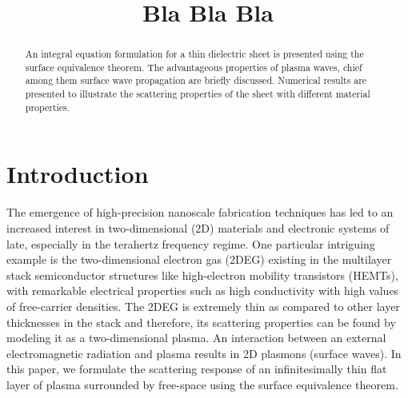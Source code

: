 \documentclass[conference, 10pt]{IEEEtran}
\renewcommand{\^}{\hat}  %
\begin{document}
\title{Bla Bla Bla }


\author{
\and
{}
}
\maketitle


%
\begin{abstract}
  An integral equation formulation for a thin dielectric sheet is presented using the surface equivalence theorem. The advantageous properties of plasma waves, chief among them surface wave propagation are briefly discussed. Numerical results are presented to illustrate the scattering properties of the sheet with different material properties.
\end{abstract}

\IEEEpeerreviewmaketitle
\section{Introduction}

The emergence of high-precision nanoscale fabrication techniques has led to an increased interest in two-dimensional (2D) materials and electronic systems of late, especially in the terahertz frequency regime. One particular intriguing example is the two-dimensional electron gas (2DEG) existing in the multilayer stack semiconductor structures like high-electron mobility transistors (HEMTs), with remarkable electrical properties such as high conductivity with high values of free-carrier densities. The 2DEG is extremely thin as compared to other layer thicknesses in the stack and therefore, its scattering properties can be found by modeling it as a two-dimensional plasma. An interaction between an external electromagnetic radiation and plasma results in 2D plasmons (surface waves). In this paper, we formulate the scattering response of an infinitesimally thin flat layer of plasma surrounded by free-space using the surface equivalence theorem.
\end{document}
